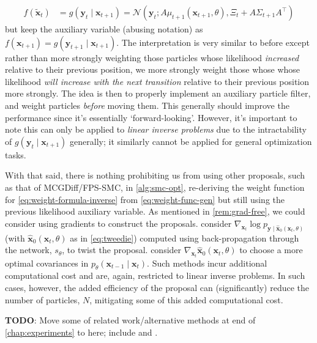 \begin{align*}
    f(\tilde{\mathbf{x}}_t) &= g(\mathbf{y}_t \mid \mathbf{x}_{t+1}) = \mathcal{N}\left(\mathbf{y}_t; A\mu_{t+1}(\mathbf{x}_{t+1}, \theta), \Xi_t + A\Sigma_{t+1}A^\top\right)
\end{align*}
but keep the auxiliary variable (abusing notation) as
$f(\mathbf{x}_{t+1}) = g(\mathbf{y}_{t+1} \mid \mathbf{x}_{t+1})$. The interpretation is very
similar to before except rather than more strongly weighting those particles whose likelihood
\emph{increased} relative to their previous position, we more strongly weight those whose whose
likelihood \emph{will increase with the next transition} relative to their previous position more
strongly. The idea is then to properly implement an auxiliary particle filter, and weight particles
\emph{before} moving them. This generally should improve the performance since it's essentially
`forward-looking'. However, it's important to note this can only be applied to \emph{linear
inverse problems} due to the intractability of $g(\mathbf{y}_t \mid \mathbf{x}_{t+1})$ generally;
it similarly cannot be applied for general optimization tasks.

With that said, there is nothing prohibiting us from using other proposals, such as that of
MCGDiff/FPS-SMC, in \autoref{alg:smc-opt}, re-deriving the weight function for
\autoref{eq:weight-formula-inverse} from \autoref{eq:weight-func-gen} but still using the previous
likelihood auxiliary variable. As mentioned in \autoref{rem:grad-free}, we could consider using
gradients to construct the proposals. \textcite{wuPracticalAsymptoticallyExact2023} consider
$\nabla_{\mathbf{x}_t}\log p_{\mathbf{y} \mid \hat{\mathbf{x}}_0(\mathbf{x}_t, \theta)}$ (with
$\hat{\mathbf{x}}_0(\mathbf{x}_t, \theta)$ as in \autoref{eq:tweedie}) computed using back-propagation
through the network, $s_\theta$, to twist the proposal. \textcite{boysTweedieMomentProjected2023}
consider $\nabla_{\mathbf{x}_t}\hat{\mathbf{x}}_0(\mathbf{x}_t, \theta)$ to choose a more optimal
covariances in $p_\theta(\mathbf{x}_{t-1} \mid \mathbf{x}_t)$. Such methods incur additional
computational cost and are, again, restricted to linear inverse problems. In such cases, however,
the added efficiency of the proposal can (significantly) reduce the number of particles, $N$,
mitigating some of this added computational cost.

\textbf{TODO}: Move some of related work/alternative methods at end of \ref{chap:experiments} to
here; include \cite{guoGradientGuidanceDiffusion2024} and \cite{kongDiffusionModelsConstrained2024}.
